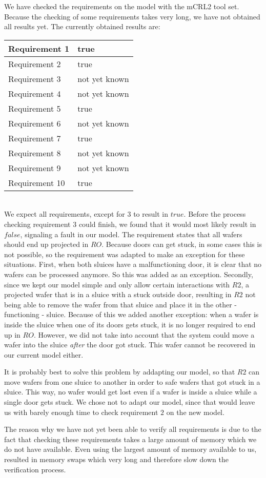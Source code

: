 We have checked the requirements on the model with the mCRL2 tool set. Because the checking of some requirements takes very long, we have not obtained all results yet. The currently obtained results are:\\


\begin{tabular}{|l|l|}
\hline
Requirement 1 & true \\
\hline
Requirement 2 & true \\
\hline
Requirement 3 & not yet known \\
\hline
Requirement 4 & not yet known \\
\hline
Requirement 5 & true \\
\hline
Requirement 6 & not yet known \\
\hline
Requirement 7 & true \\
\hline
Requirement 8 & not yet known \\
\hline
Requirement 9 & not yet known \\
\hline
Requirement 10 & true \\
\hline
\end{tabular} \\


We expect all requirements, except for $3$ to result in $true$. Before the process checking requirement $3$ could finish, we found that it would most likely result in $false$, signaling a fault in our model. The requirement states that all wafers should end up projected in $RO$. Because doors can get stuck, in some cases this is not possible, so the requirement was adapted to make an exception for these situations. First, when both sluices have a malfunctioning door, it is clear that no wafers can be processed anymore. So this was added as an exception. Secondly, since we kept our model simple and only allow certain interactions with $R2$, a projected wafer that is in a sluice with a stuck outside door, resulting in $R2$ not being able to remove the wafer from that sluice and place it in the other - functioning - sluice. Because of this we added another exception: when a wafer is inside the sluice when one of its doors gets stuck, it is no longer required to end up in $RO$. However, we did not take into account that the system could move a wafer into the sluice \emph{after} the door got stuck. This wafer cannot be recovered in our current model either.

It is probably best to solve this problem by addapting our model, so that $R2$ can move wafers from one sluice to another in order to safe wafers that got stuck in a sluice. This way, no wafer would get lost even if a wafer is inside a sluice while a single door gets stuck. We chose not to adapt our model, since that would leave us with barely enough time to check requirement $2$ on the new model.

The reason why we have not yet been able to verify all requirements is due to the fact that checking these requirements takes a large amount of memory which we do not have available. Even using the largest amount of memory available to us, resulted in memory swaps which very long and therefore slow down the verification process. 
